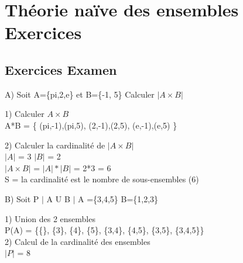 \newpage

\section{Théorie naïve des ensembles Exercices}
\vspace{5mm} %

\subsection{Exercices Examen}
\vspace{3mm} %

A) Soit A=\{pi,2,e\} et B=\{-1, 5\} Calculer ${|A\times B|}$ \\

\vspace{4mm} %

  1) Calculer ${A\times B}$ \\

  A*B = \{ (pi,-1),(pi,5), (2,-1),(2,5), (e,-1),(e,5) \}

  \vspace{8mm} %

    2) Calculer la cardinalité de ${|A\times B|}$ \\

      ${|A|}$ = 3  ${|B|}$ = 2 \\

      ${|A\times B|}$ = ${|A|}*{|B|}$ = 2*3 = 6 \\

      S = la cardinalité est le nombre de sous-ensembles (6)\\

  \vspace{8mm} %

  B) Soit P $|$ A U B $|$ A =\{3,4,5\} B=\{1,2,3\} \\

  \vspace{5mm} %

  1) Union des 2 ensembles \\

  P(A) = \{\{\}, \{3\}, \{4\}, \{5\}, \{3,4\}, \{4,5\}, \{3,5\}, \{3,4,5\}\} \\

  \vspace{4mm} %
  2) Calcul de la cardinalité des ensembles \\

  $|P|$ = 8 \\
